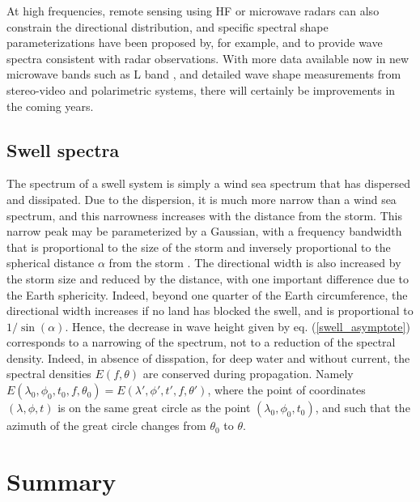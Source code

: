 At high frequencies, remote sensing using HF \citep[e.g.][]{Kirincich2016} or microwave radars can also constrain the directional distribution, and specific spectral 
shape parameterizations have been proposed by, for example, \citep{Elfouhaily&al.1997} and \citep{Kudryavtsev&al.2003a}
 to provide  wave spectra  consistent with radar observations. With more data available now in new microwave bands 
such as L band \citep[e.g.][]{Yueh&al.2013}, and detailed wave shape measurements from stereo-video and polarimetric systems, 
there will certainly be improvements in the coming years. 



\subsection{Swell spectra}
The spectrum of a swell system is simply a wind sea spectrum that has dispersed 
and dissipated. Due to the dispersion, it is much more narrow than a wind sea spectrum, and this narrowness increases with the 
distance from the storm. This narrow peak may be parameterized by a Gaussian, with a frequency bandwidth that is  proportional
to the size of the storm and inversely proportional to the spherical distance $\alpha$  from the storm \citep{Collard&al.2009}. 
The directional width is also increased by the storm size and reduced by the distance, with one important difference due to the Earth 
sphericity. Indeed, beyond one quarter of the Earth circumference, the directional width increases 
if no land has blocked the swell, and is proportional to  $1/\sin (\alpha)$. Hence, the 
decrease in wave height given by eq. (\ref{swell_asymptote}) 
corresponds to a narrowing of the spectrum, not to a reduction of the spectral density. Indeed, 
in absence of disspation, for deep water and without current, the 
spectral densities  $E(f,\theta)$ are conserved during propagation. Namely 
$E(\lambda_0,\phi_0,t_0,f,\theta_0)=E(\lambda',\phi',t',f,\theta')$, where the point of coordinates  $(\lambda,\phi,t)$ is on the same 
great circle as the point  $(\lambda_0,\phi_0,t_0)$, and such that the azimuth of the great circle changes from $\theta_0$ to $\theta$. 

\section{Summary}
